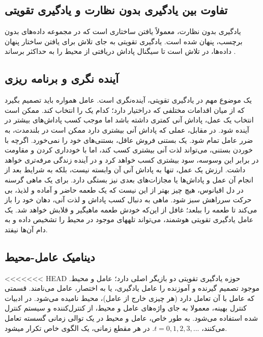 \subsection*{تفاوت بین یادگیری بدون نظارت و یادگیری تقویتی}
یادگیری بدون نظارت، معمولاً یافتن ساختاری است که در مجموعه داده‌های بدون برچسب، پنهان شده است. یادگیری تقویتی به جای تلاش برای یافتن ساختار پنهان داده‌ها، در تلاش است تا سیگنال پاداش دریافتی از محیط را به حداکثر برساند
\cite{suttonbook}.
\subsection{آینده نگری و برنامه ریزی}
یک موضوع مهم در یادگیری تقویتی، آینده‌نگری است. عامل همواره باید تصمیم بگیرد که از میان اقدامات مختلفی که دراختیار دارد؛ کدام یک را انتخاب کند. ممکن است انتخاب یک عمل، پاداش آنی کمتری داشته باشد اما موجب کسب پاداش‌های بیشتر در آینده شود. در مقابل، عملی که پاداش آنی بیشتری دارد ممکن است در بلند‌مدت، به ضرر عامل تمام شود.  یک بستنی فروش عاقل، بستنی‌های خود را نمی‌خورد. اگرچه با خوردن بستنی، می‌تواند لذت  آنی بیشتری کسب کند، اما با خودداری کردن و مقاومت در برابر این وسوسه، سود بیشتری کسب ‌خواهد کرد و در آینده زندگی مرفه‌تری خواهد داشت.
ارزش یک عمل، تنها به پاداش آنی آن وابسته نیست، بلکه به شرایط بعد از انجام آن عمل و پاداش‌ها یا مجازات‌های بعدی نیز بستگی دارد. برای یک ماهی گرسنه در دل اقیانوس، هیچ چیز بهتر از این نیست که یک طعمه حاضر و آماده و لذیذ، بی حرکت سرراهش سبز شود. ماهی به دنبال کسب پاداش و لذت آنی، دهان خود را باز می‌کند تا طعمه را ببلعد؛ غافل از این‌که خودش طعمه ماهیگیر و قلابش خواهد شد. یک عامل یادگیری تقویتی هوشمند، می‌تواند تله\nf های موجود در محیط را تشخیص داده و به دام آن‌ها نیفتد.
\subsection{دینامیک عامل-محیط}
<<<<<<< HEAD
حوزه یادگیری تقویتی  دو بازیگر اصلی دارد؛ عامل و محیط. موجود تصمیم گیرنده و آموزنده را عامل یادگیری، یا به اختصار، عامل می‌نامند. قسمتی که عامل با آن تعامل دارد (هر چیزی خارج از عامل)، محیط نامیده می‌شود. در ادبیات کنترل بهینه، معمولا به جای واژه‌های عامل و محیط، از  کنترل‌کننده
و سیستم کنترل شده استفاده می‌شود. به طور خاص، عامل و محیط در یک توالی زمانی گسسته تعامل می‌کنند، 
$t = 0,1,2,3,...$.
در هر مقطع زمانی، یک الگوی خاص تکرار می\nf شود.




